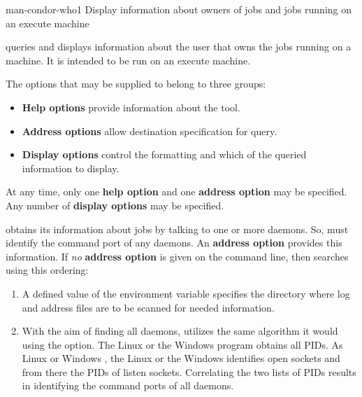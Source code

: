 \begin{ManPage}{}{man-condor-who}{1}
{Display information about owners of jobs and jobs running on an execute machine}

\Synopsis {}

\Description
{} queries and displays information about the user that
owns the jobs running on a machine.
It is intended to be run on an execute machine.

The options that may be supplied to  belong to three groups:
\begin{itemize}
  \item \textbf{Help options} provide information about the 
  tool.
  \item \textbf{Address options} allow destination specification for query.
  \item \textbf{Display options} control the formatting and which of the 
  queried information to display.
\end{itemize}

At any time, only one \textbf{help option} and one \textbf{address option}
may be specified.  
Any number of \textbf{display options} may be specified.

 obtains its information about jobs by talking to 
one or more  daemons.
So,  must identify the command port of any 
daemons.
An \textbf{address option} provides this information.
If \emph{no} \textbf{address option} is given on the command line,
then  searches using this ordering:
\begin{enumerate}
  \item A defined value of the environment variable 
  specifies the directory where log and address files are to be scanned
  for needed information.
  \item With the aim of finding all  daemons,
   utilizes the same algorithm it would using the
   option.
  The Linux  or the Windows 
  program obtains all PIDs.
  As Linux  or Windows ,
  the Linux  or the Windows  identifies open
  sockets and from there the PIDs of listen sockets.
  Correlating the two lists of PIDs results in identifying the command ports of
  all  daemons. 
\end{enumerate}



\end{ManPage}
